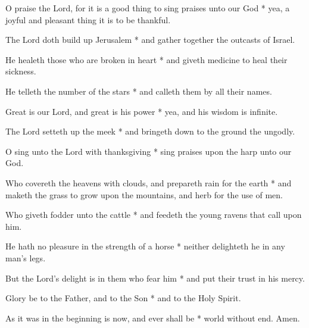 O praise the Lord, for it is a good thing to sing praises unto our God * yea, a joyful and pleasant thing it is to be thankful.

The Lord doth build up Jerusalem * and gather together the outcasts of Israel.
	
He healeth those who are broken in heart * and giveth medicine to heal their sickness.
	
He telleth the number of the stars * and calleth them by all their names.

Great is our Lord, and great is his power * yea, and his wisdom is infinite.
	
The Lord setteth up the meek * and bringeth down to the ground the ungodly.
	
O sing unto the Lord with thanksgiving * sing praises upon the harp unto our God.

Who covereth the heavens with clouds, and prepareth rain for the earth * and maketh the grass to grow upon the mountains, and herb for the use of men.
	
Who giveth fodder unto the cattle * and feedeth the young ravens that call upon him.
	
He hath no pleasure in the strength of a horse * neither delighteth he in any man's legs.
	
But the Lord's delight is in them who fear him * and put their trust in his mercy.
	
Glory be to the Father, and to the Son * and to the Holy Spirit.
	
As it was in the beginning is now, and ever shall be * world without end. Amen.